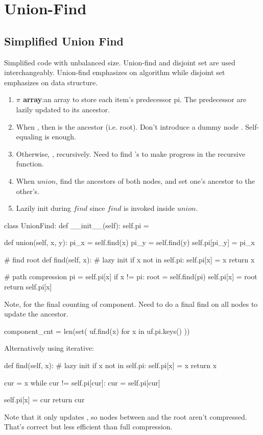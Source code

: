 \section{Union-Find}\label{section:unionFind}
\subsection{Simplified Union Find}
Simplified code with unbalanced size. Union-find and disjoint set are used interchangeably. Union-find emphasizes on algorithm while disjoint set emphasizes on data structure.

\begin{enumerate}
\item \textbf{$\pi$ array}:an array to store each item's predecessor pi. The predecessor are lazily updated to its ancestor. 
\item When , then  is the ancestor (i.e. root). Don't introduce a dummy node . Self-equaling is enough.
\item Otherwise, , recursively. Need to find 's  to make progress in the recursive function.
\item When $union$, find the ancestors of both nodes, and set one's ancestor to the other's.  
\item Lazily init  during $find$ since $find$ is invoked inside $union$. 
\end{enumerate}
\begin{python}
class UnionFind:
    def __init__(self):
        self.pi = {}

    def union(self, x, y):
        pi_x = self.find(x)
        pi_y = self.find(y)
        self.pi[pi_y] = pi_x

    # find root
    def find(self, x):
        # lazy init
        if x not in self.pi:
          self.pi[x] = x
          return x
        
        # path compression
        pi = self.pi[x]
        if x != pi:
          root = self.find(pi)
          self.pi[x] = root
        return self.pi[x]
\end{python}

Note, for the final counting of component. Need to do a final find on all nodes to
update the ancestor.
\begin{python}
component_cnt = len(set(
    uf.find(x)
    for x in uf.pi.keys()
))
\end{python}
Alternatively using iterative:
\begin{python}
def find(self, x):
    # lazy init
    if x not in self.pi:
        self.pi[x] = x
        return x

    cur = x
    while cur != self.pi[cur]:
        cur = self.pi[cur]

    self.pi[x] = cur
    return cur
\end{python}
Note that it only updates , so nodes between  and the root aren’t compressed. That’s correct but less efficient than full compression.


